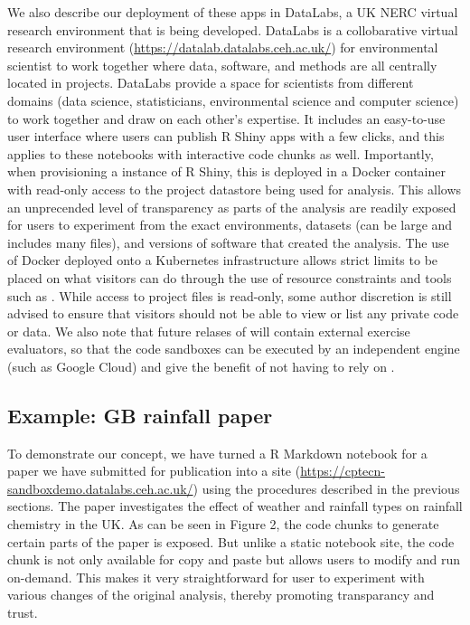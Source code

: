 We also describe our deployment of these apps in DataLabs, a UK NERC
virtual research environment that is being developed. DataLabs is a
collobarative virtual research environment \citep{Hollaway2020}
(\url{https://datalab.datalabs.ceh.ac.uk/}) for environmental scientist
to work together where data, software, and methods are all centrally
located in projects. DataLabs provide a space for scientists from
different domains (data science, statisticians, environmental science
and computer science) to work together and draw on each other's
expertise. It includes an easy-to-use user interface where users can
publish R Shiny apps with a few clicks, and this applies to these
notebooks with interactive code chunks as well. Importantly, when
provisioning a instance of R Shiny, this is deployed in a Docker
container with read-only access to the project datastore being used for
analysis. This allows an unprecended level of transparency as parts of
the analysis are readily exposed for users to experiment from the exact
environments, datasets (can be large and includes many files), and
versions of software that created the analysis. The use of Docker
deployed onto a Kubernetes infrastructure allows strict limits to be
placed on what visitors can do through the use of resource constraints
and tools such as  \citep{RAppArmor}. While access to
project files is read-only, some author discretion is still advised to
ensure that visitors should not be able to view or list any private code
or data. We also note that future relases of  will
contain external exercise evaluators, so that the code sandboxes can be
executed by an independent engine (such as Google Cloud) and give the
benefit of not having to rely on .

\hypertarget{example-gb-rainfall-paper}{%
\subsection{Example: GB rainfall
paper}\label{example-gb-rainfall-paper}}

To demonstrate our concept, we have turned a R Markdown notebook for a
paper we have submitted for publication into a  site
(\url{https://cptecn-sandboxdemo.datalabs.ceh.ac.uk/}) using the
procedures described in the previous sections. The paper investigates
the effect of weather and rainfall types on rainfall chemistry in the
UK. As can be seen in Figure 2, the code chunks to generate certain
parts of the paper is exposed. But unlike a static notebook site, the
code chunk is not only available for copy and paste but allows users to
modify and run on-demand. This makes it very straightforward for user to
experiment with various changes of the original analysis, thereby
promoting transparancy and trust.

